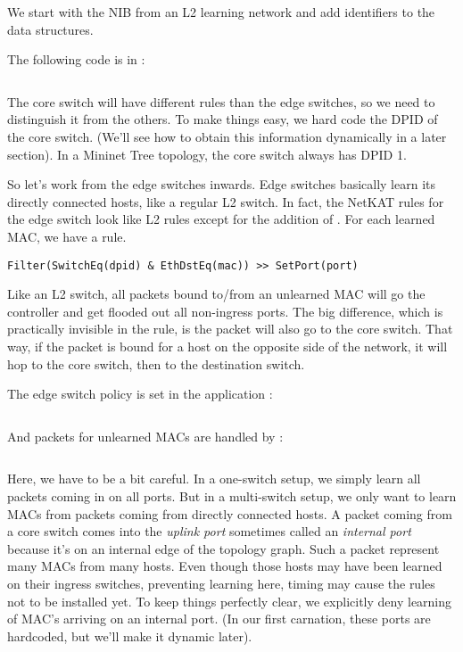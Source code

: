 We start with the NIB from an L2 learning network and add  identifiers to the data
structures.

The following code is in  :

\inputminted{python}{code/multiswitch_topologies/network_information_base.py}

The core switch will have different rules than the edge switches, so we need to distinguish it
from the others.  To make things easy, we hard code the DPID of the core switch.  (We'll see 
how to obtain this information dynamically in a later section).  In a Mininet Tree topology,
the core switch always has DPID 1.  

So let's work from the edge switches inwards.  Edge switches basically learn its directly
connected hosts, like a regular L2 switch.  In fact, the NetKAT rules for the edge switch 
look like L2 rules except for the addition of .  For each learned MAC, we have a rule.

\begin{verbatim}
Filter(SwitchEq(dpid) & EthDstEq(mac)) >> SetPort(port) 
\end{verbatim}

Like an L2 switch, all packets bound to/from an unlearned MAC will go the controller and get flooded
out all non-ingress ports.  The big difference, which is practically invisible in the rule, is
the packet will also go to the core switch.  That way, if the packet is bound for a host on the 
opposite side of the network, it will hop to the core switch, then to the destination switch.  

The edge switch policy is set in the application :

\inputminted[firstline=22,lastline=40]{python}{code/multiswitch_topologies/multiswitch1.py}

And packets for unlearned MACs are handled by :

\inputminted[firstline=56,lastline=80]{python}{code/multiswitch_topologies/multiswitch1.py}

Here, we have to be a bit careful.  In a one-switch setup, we simply learn all packets coming in
on all ports.  But in a multi-switch setup, we only want to learn MACs from packets coming from
directly connected hosts.  A packet coming from a core switch comes into the \emph{uplink port}
sometimes called an \emph{internal port} because it's on an internal edge of the topology
graph.  
Such a packet represent many MACs from many hosts.  Even though those hosts may have been learned on their
ingress switches, preventing learning here, timing may cause the rules not to be installed yet.
To keep things perfectly clear, we explicitly deny learning of MAC's arriving on an internal port.
(In our first carnation, these ports are hardcoded, but we'll make it dynamic later).

